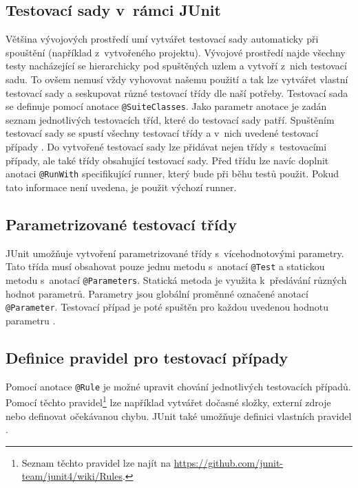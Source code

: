     \subsection{Testovací sady v~rámci JUnit}
    Většina vývojových prostředí umí vytvářet testovací sady automaticky při spouštění (například z~vytvořeného projektu). Vývojové prostředí najde všechny testy nacházející se hierarchicky pod spuštěných uzlem a vytvoří z~nich testovací sadu. To ovšem nemusí vždy vyhovovat našemu použití a tak lze vytvářet vlastní testovací sady a seskupovat různé testovací třídy dle naší potřeby. Testovací sada se definuje pomocí anotace \texttt{@SuiteClasses}. Jako parametr anotace je zadán seznam jednotlivých testovacích tříd, které do testovací sady patří. Spuštěním testovací sady se spustí všechny testovací třídy a v~nich uvedené testovací případy \cite{vogella:JUnit}. Do vytvořené testovací sady lze přidávat nejen třídy s~testovacími případy, ale také třídy obsahující testovací sady. Před třídu lze navíc doplnit anotaci \texttt{@RunWith} specifikující runner, který bude při běhu testů použit. Pokud tato informace není uvedena, je použit výchozí runner.

    \subsection{Parametrizované testovací třídy}
    JUnit umožňuje vytvoření parametrizované třídy s~vícehodnotovými parametry. Tato třída musí obsahovat pouze jednu metodu s~anotací \texttt{@Test} a statickou metodu s~anotací \texttt{@Para\-meters}. Statická metoda je využita k~předávání různých hodnot parametrů. Parametry jsou globální proměnné označené anotací \texttt{@Parameter}. Testovací případ je poté spuštěn pro každou uvedenou hodnotu parametru \cite{vogella:JUnit}.

    \subsection{Definice pravidel pro testovací případy}
    Pomocí anotace \texttt{@Rule} je možné upravit chování jednotlivých testovacích případů. Pomocí těchto pravidel\footnote{Seznam těchto pravidel lze najít na \url{https://github.com/junit-team/junit4/wiki/Rules}.} lze například vytvářet dočasné složky, externí zdroje nebo definovat očekávanou chybu. JUnit také umožňuje definici vlastních pravidel \cite{vogella:JUnit}.

